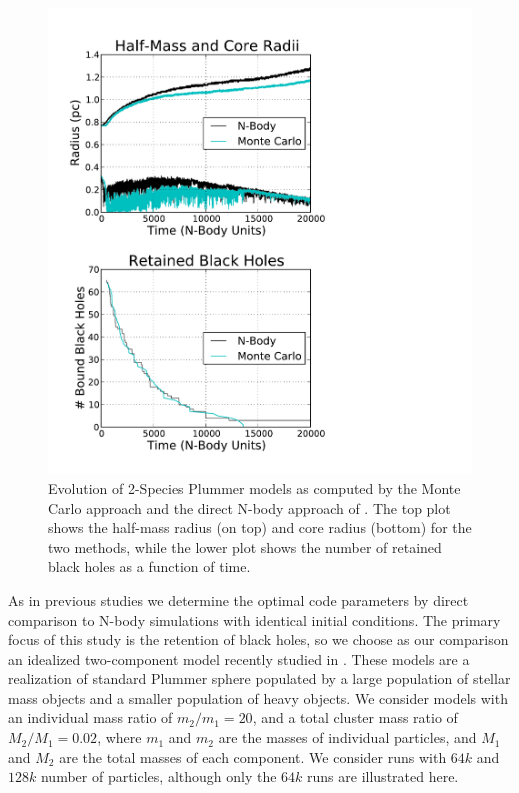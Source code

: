 \documentclass[11pt,a4paper]{emulateapj}
\begin{document}
\begin{figure}[h!]
  \includegraphics[scale=0.65]{64.pdf}
  \caption{Evolution of 2-Species Plummer models as computed by the Monte Carlo
  approach and the direct N-body approach of \cite{2013MNRAS.432.2779B}.  The
  top plot shows the half-mass radius (on top) and core radius (bottom) for the
  two methods, while the lower plot shows the number of retained black holes as
  a function of time.}
  \label{fig:2species64k}
\end{figure}


As in previous studies \citep{Joshi:2000tv} we determine the optimal code
parameters by direct comparison to N-body simulations with identical initial
conditions.  The primary focus of this study is the retention of black holes,
so we choose as our comparison an idealized two-component model recently studied 
in \cite{2013MNRAS.432.2779B}.  These models are a realization of standard Plummer
sphere populated by a large population of stellar mass objects and a smaller
population of heavy objects.  We consider models with an individual mass ratio of
$m_2/m_1 = 20$, and a total cluster mass ratio of $M_2/M_1 = 0.02$, where $m_1$
and $m_2$ are the masses of individual particles, and $M_1$ and $M_2$ are the
total masses of each component.  We consider runs with $64k$ and $128k$ number
of particles, although only the $64k$ runs are illustrated here.
\end{document}
